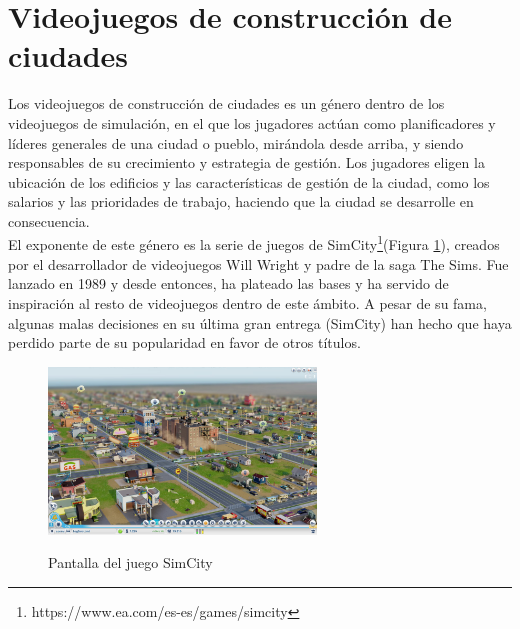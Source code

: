 \section{Videojuegos de construcción de ciudades}

Los videojuegos de construcción de ciudades es un género dentro de los videojuegos de simulación, en el que los jugadores actúan como planificadores y líderes generales de una ciudad o pueblo, mirándola desde arriba, y siendo responsables de su crecimiento y estrategia de gestión. Los jugadores eligen la ubicación de los edificios y las características de gestión de la ciudad, como los salarios y las prioridades de trabajo, haciendo que la ciudad se desarrolle en consecuencia. \\

El exponente de este género es la serie de juegos de SimCity\texttrademark\footnote{https://www.ea.com/es-es/games/simcity}\xspace (Figura \ref{fig:simcity}), creados por el desarrollador de videojuegos Will Wright y padre de la saga The Sims\texttrademark. Fue lanzado en 1989 y desde entonces, ha plateado las bases y ha servido de inspiración al resto de videojuegos dentro de este ámbito. A pesar de su fama, algunas malas decisiones en su última gran entrega (SimCity\texttrademark\xspace 2013) han hecho que haya perdido parte de su popularidad en favor de otros títulos. \\

\begin{figure}[h]
	\centering
	\includegraphics[height=12em]{images/SimCity}
	\label{fig:simcity}
	\caption{Pantalla del juego SimCity\texttrademark}
\end{figure}

